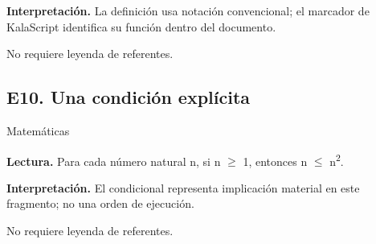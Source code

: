 \textbf{Interpretación.} La definición usa notación convencional; el marcador de KalaScript identifica su función dentro del documento.

{\small\color{KalaSuave}No requiere leyenda de referentes.}

\vspace{6mm}

\subsection{E10. Una condición explícita}

{\small\sffamily\color{KalaAcento}Matemáticas}


\textbf{Lectura.} Para cada número natural n, si n \ensuremath{\geq} 1, entonces n \ensuremath{\leq} n\textsuperscript{2}.

\textbf{Interpretación.} El condicional representa implicación material en este fragmento; no una orden de ejecución.

{\small\color{KalaSuave}No requiere leyenda de referentes.}
